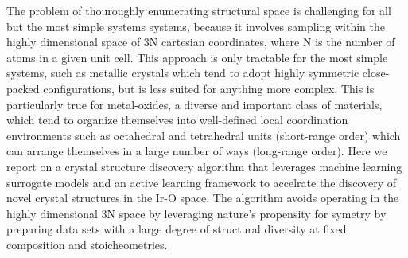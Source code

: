 %
The problem of thouroughly enumerating structural space is challenging for all but the most simple systems systems,
because it involves sampling within the highly dimensional space of 3N cartesian coordinates, where N is the number of atoms in a given unit cell.
This approach is only tractable for the most simple systems,
such as metallic crystals which tend to adopt highly symmetric close-packed configurations, but is less suited for anything more complex.
%
This is particularly true for metal-oxides, a diverse and important class of materials,
which tend to organize themselves into well-defined local coordination environments such as octahedral and tetrahedral units (short-range order) which can arrange themselves in a large number of ways (long-range order).
%
%
Here we report on a crystal structure discovery algorithm that leverages machine learning surrogate models and an active learning framework to accelrate
the discovery of novel crystal structures in the Ir-O space.
%
The algorithm avoids operating in the highly dimensional 3N space by leveraging nature's propensity for symetry by preparing data sets with a large degree of structural diversity at fixed composition and stoicheometries.
%
%





